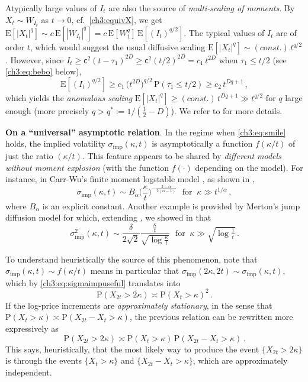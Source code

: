 \documentclass[a4paper,reqno,11pt]{amsart}
\numberwithin{equation}{section}
\newcommand{\PEfont}{\mathrm}
\renewcommand{\P}{\ensuremath{\PEfont P}}
\newcommand{\E}{\ensuremath{\PEfont E}}
\newcommand\sfc{\mathsf{c}}
\newcommand\imp{\mathrm{imp}}
\begin{document}
Atypically large values of $I_t$ are also the source of \emph{multi-scaling of moments}.
By $X_t \sim W_{I_t}$ as $t \to 0$, cf.\ \eqref{ch3:equivX}, we get
$\E[|X_t|^q] \sim c \, \E[|W_{I_t}|^q] = c \, \E[W_1^q] \, \E[(I_t)^{q/2}]$.
The typical values of $I_t$ are of order $t$, which would suggest
the usual diffusive scaling $\E[|X_t|^q] \sim (const.) \, t^{q/2}$. However,
since $I_t \ge \sfc^2 (t-\tau_1)^{2D} \ge \sfc^2 (t/2)^{2D} = c_1 \, t^{2D}$ 
when $\tau_1 \le t/2$
(see \eqref{ch3:eq:bebo} below),
\begin{equation*}
	\E[(I_t)^{q/2}] \ge c_1 \, \big( t^{2D} \big)^{q/2} \, \P(\tau_1 \le t/2) \ge
	c_2 \, t^{Dq+1} \,,
\end{equation*}
which yields the \emph{anomalous scaling}
$\E[|X_t|^q] \ge (const.) \, t^{Dq+1} \gg t^{q/2}$ for $q$ large enough
(more precisely $q > q^* := 1/(\frac{1}{2}-D)$).
We refer to \cite{cf:ACDP} for more details.


\medskip
\noindent
\textbf{On a ``universal'' asymptotic relation}.
In the regime when \eqref{ch3:eq:smile} holds, the implied volatility
$\sigma_\imp(\kappa,t)$ is asymptotically a function $f(\kappa/t)$ of just the ratio $(\kappa/t)$.
This feature appears to be shared
by \emph{different models without moment explosion}
(with the function $f(\cdot)$ depending on the model). For instance, in
Carr-Wu’s finite moment logstable model \cite{cf:CW04},
as shown in \cite[Theorem 3.1]{cf:CC},
\begin{equation*}
	\sigma_\imp(\kappa,t) \sim B_\alpha \bigg( \frac{\kappa}{t} \bigg)^{-\frac{2-\alpha}{2(\alpha-1)}}
	\ \ \ \text{for } \ \kappa \gg t^{1/\alpha} \,, 
\end{equation*}
where $B_\alpha$ is an explicit constant.
Another example is provided by Merton's jump diffusion model \cite{cf:M}
for which, extending \cite{cf:BF}, we showed in \cite[Theorem 3.4]{cf:CC} that
\begin{equation*} 
 \sigma_\imp^2(\kappa,t) \sim \frac{\delta}{2\sqrt{2}}
 \frac{\frac{\kappa}{t}}{\sqrt{\log \frac{\kappa}{t}}}
 \ \ \ \text{for } \ \kappa \gg \sqrt{\log\tfrac{1}{t}} \,.
\end{equation*}

To understand heuristically the source of this phenomenon, note that
$\sigma_\imp(\kappa,t) \sim f(\kappa/t)$ means in particular that
$\sigma_\imp(2\kappa, 2t) \sim \sigma_\imp(\kappa,t)$, which by
\eqref{ch3:eq:sigmaimpuseful} translates into
\begin{equation} \label{ch3:eq:heuri0}
	\P(X_{2t} > 2\kappa) \asymp
	\P(X_{t} > \kappa)^2 \,.
\end{equation}
If the log-price increments are \emph{approximately stationary}, in the sense that
$\P(X_{t} > \kappa) \asymp \P(X_{2t} - X_{t} > \kappa)$,
the previous relation can be rewritten more expressively as
\begin{equation} \label{ch3:eq:heuri}
	\P(X_{2t} > 2\kappa) \asymp
	\P(X_{t} > \kappa) \, \P(X_{2t} - X_t > \kappa) \,.
\end{equation}
This says, heuristically, that the most likely way to produce the event
$\{X_{2t} > 2\kappa\}$ is through the events $\{X_t > \kappa\}$
and $\{X_{2t}-X_t > \kappa\}$, which are approximately independent.
\end{document}
